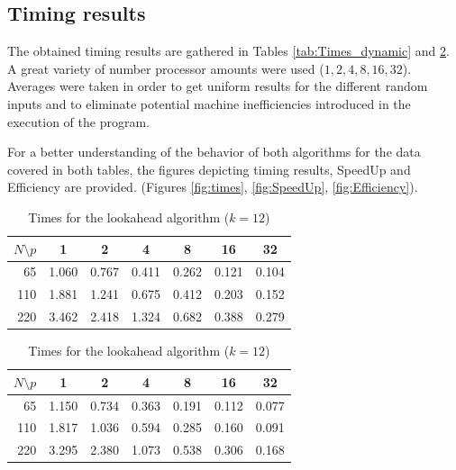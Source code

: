 \documentclass[letterpaper,twoside,11pt]{article}
\begin{document}
\begin{multicols}{2}
\subsection{Timing results} %
\label{sub:timing_results}

The obtained timing results are gathered in Tables \ref{tab:Times_dynamic} and \ref{tab:Times_lookahead}. A great variety of number processor amounts were used ($1, 2, 4, 8, 16, 32$). Averages were taken in order to get uniform results for the different random inputs and to eliminate potential machine inefficiencies introduced in the execution of the program.

For a better understanding of the behavior of both algorithms for the data covered in both tables, the figures depicting timing results, SpeedUp and Efficiency are provided. (Figures \ref{fig:times}, \ref{fig:SpeedUp}, \ref{fig:Efficiency}).

\begin{table}[H]
    \begin{subtable}{.5\textwidth}
      \centering
        \begin{tabular}{*{7}{r}}
        $ N \setminus p$ &   \multicolumn{1}{c}{\textbf{1}} &\multicolumn{1}{c}{\textbf{2}} &\multicolumn{1}{c}{\textbf{4}} &\multicolumn{1}{c}{\textbf{8}} &\multicolumn{1}{c}{\textbf{16}} &\multicolumn{1}{c}{\textbf{32}}\\
            \midrule
            65 & 1.060 & 0.767 & 0.411 & 0.262 & 0.121 & 0.104 \\
            110 & 1.881 & 1.241 & 0.675 & 0.412 & 0.203 & 0.152 \\
            220 & 3.462 & 2.418 & 1.324 & 0.682 & 0.388 & 0.279 \\
        \end{tabular}
        \caption{Times for the dynamic algorithm ($k = 12$)}
        \label{tab:Times_dynamic}
    \end{subtable}%

    \begin{subtable}{.5\textwidth}
      \centering
        \begin{tabular}{*{7}{r}}
        $ N \setminus p$ &   \multicolumn{1}{c}{\textbf{1}} &\multicolumn{1}{c}{\textbf{2}} &\multicolumn{1}{c}{\textbf{4}} &\multicolumn{1}{c}{\textbf{8}} &\multicolumn{1}{c}{\textbf{16}} &\multicolumn{1}{c}{\textbf{32}}\\
            \midrule
            65 & 1.150 & 0.734 & 0.363 & 0.191 & 0.112 & 0.077 \\
            110 & 1.817 & 1.036 & 0.594 & 0.285 & 0.160 & 0.091 \\
            220 & 3.295 & 2.380 & 1.073 & 0.538 & 0.306 & 0.168 \\
        \end{tabular}
        \caption{Times for the lookahead algorithm ($k = 12$)}
        \label{tab:Times_lookahead}
    \end{subtable}%


\end{table}
\end{multicols}
\end{document}
